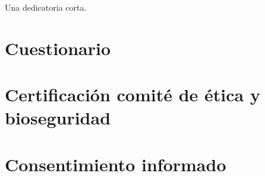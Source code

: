 \documentclass{umemoria}
\begin{document}

\begin{dedicatoria}
Una dedicatoria corta.
\end{dedicatoria}

\begin{thanks}



\end{thanks}

\tableofcontents
\listoftables %
\listoffigures %

\mainmatter









\printbibliography[
    heading=bibintoc,
]

\begin{appendices}

% 

\chapter{Cuestionario}
\label{anexo:cuestionario}


\chapter{Certificación comité de ética y bioseguridad}
\label{anexo:certificacion-comite-de-etica-y-bioseguridad}


\chapter{Consentimiento informado}
\label{anexo:consentimiento}




\end{appendices}
\end{document}
